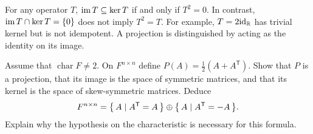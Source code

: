 \begin{Remark*}
For any operator $T$, $\operatorname{im} T\subseteq\ker T$ if and only if $T^2=0$. In contrast, $\operatorname{im} T\cap\ker T=\{0\}$ does not imply $T^2=T$. For example, $T=2\mathrm{id}_{\mathbb R}$ has trivial kernel but is not idempotent. A projection is distinguished by acting as the identity on its image.
\end{Remark*}

\begin{Exercise}
Assume that $\operatorname{char}F\ne2$. On $F^{n\times n}$ define $P(A)=\frac12(A+A^{\mathsf T})$. Show that $P$ is a projection, that its image is the space of symmetric matrices, and that its kernel is the space of skew-symmetric matrices. Deduce
\begin{equation*}
F^{n\times n}=\qty{\, A \mid A^{\mathsf T}=A \,}\oplus\qty{\, A \mid A^{\mathsf T}=-A \,}.
\end{equation*}
Explain why the hypothesis on the characteristic is necessary for this formula.
\end{Exercise}
